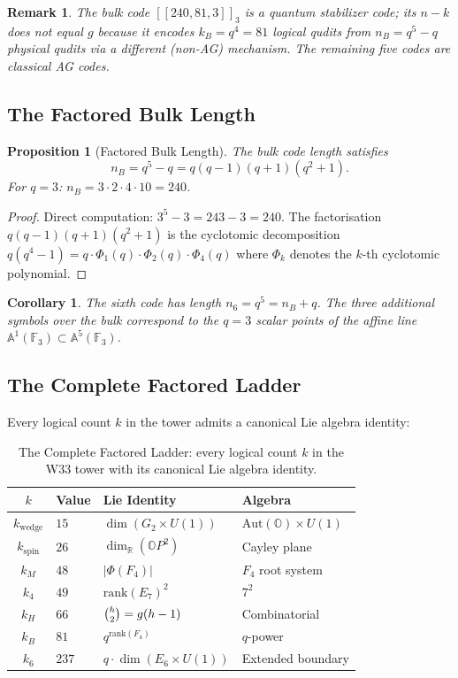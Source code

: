 \documentclass[12pt]{article}
\newtheorem{corollary}[theorem]{Corollary}
\newtheorem{proposition}[theorem]{Proposition}
\newtheorem{remark}[theorem]{Remark}
\newcommand{\F}{\mathbb{F}}
\newcommand{\R}{\mathbb{R}}
\newcommand{\O}{\mathbb{O}}
\newcommand{\OP}{\mathbb{O}P}
\newcommand{\Roots}{\Phi}
\newcommand{\Aut}{\mathrm{Aut}}
\begin{document}
\begin{remark}\label{rem:bulk}
The bulk code $[[240, 81, 3]]_3$ is a quantum stabilizer code;
its $n - k$ does not equal $g$ because it encodes $k_B = q^4 = 81$
logical qudits from $n_B = q^5 - q$ physical qudits via a different
(non-AG) mechanism. The remaining five codes are classical AG codes.
\end{remark}

\subsection{The Factored Bulk Length}

\begin{proposition}[Factored Bulk Length]\label{prop:bulk}
The bulk code length satisfies
\[
 n_B = q^5 - q = q(q-1)(q+1)(q^2+1).
\]
For $q = 3$: $n_B = 3 \cdot 2 \cdot 4 \cdot 10 = 240$.
\end{proposition}

\begin{proof}
Direct computation: $3^5 - 3 = 243 - 3 = 240$.
The factorisation $q(q-1)(q+1)(q^2+1)$ is the cyclotomic decomposition
$q(q^4-1) = q \cdot \Phi_1(q) \cdot \Phi_2(q) \cdot \Phi_4(q)$
where $\Phi_k$ denotes the $k$-th cyclotomic polynomial.
\end{proof}

\begin{corollary}\label{cor:n6}
The sixth code has length $n_6 = q^5 = n_B + q$.
The three additional symbols over the bulk correspond to the
$q = 3$ scalar points of the affine line $\mathbb{A}^1(\F_3) \subset \mathbb{A}^5(\F_3)$.
\end{corollary}

\subsection{The Complete Factored Ladder}

Every logical count $k$ in the tower admits a canonical Lie algebra identity:

\begin{table}[h!]
\centering
\renewcommand{\arraystretch}{1.4}
\begin{tabular}{clll}
\toprule
$k$ & Value & Lie Identity & Algebra \\
\midrule
$k_\mathrm{wedge}$ & $15$ & $\dim(G_2 \times U(1))$ & $\Aut(\O) \times U(1)$ \\
$k_\mathrm{spin}$ & $26$ & $\dim_{\R}(\OP^2)$ & Cayley plane \\
$k_M$ & $48$ & $|\Roots(F_4)|$ & $F_4$ root system \\
$k_4$ & $49$ & $\mathrm{rank}(E_7)^2$ & $7^2$ \\
$k_H$ & $66$ & $\tbinom{h}{2} = g(h-1)$ & Combinatorial \\
$k_B$ & $81$ & $q^{\mathrm{rank}(F_4)}$ & $q$-power \\
$k_6$ & $237$ & $q \cdot \dim(E_6 \times U(1))$ & Extended boundary \\
\bottomrule
\end{tabular}
\caption{The Complete Factored Ladder: every logical count $k$ in the W33 tower
with its canonical Lie algebra identity.}
\label{tab:ladder}
\end{table}
\end{document}
